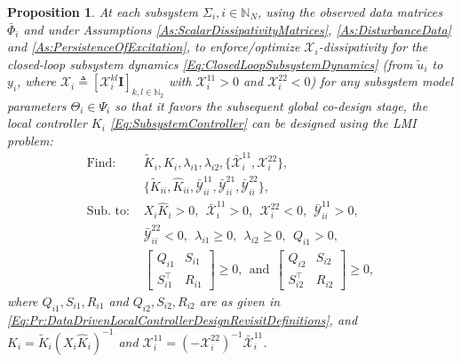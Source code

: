 \documentclass[letterpaper, 10 pt, conference]{ieeeconf}%
\newcommand{\N}{\mathbb{N}}
\newcommand{\T}{\top}
\newcommand{\I}{\mathbf{I}}
\newcommand{\0}{\mathbf{0}}
\newcommand{\X}{\mathcal{X}}
\newcommand{\Y}{\mathcal{Y}}
\newcommand{\x}{{\scriptstyle \X}}
\newcommand{\y}{{\scriptstyle \Y}}
\newcommand{\bm}[1]{\begin{bmatrix}#1\end{bmatrix}}
\newtheorem{proposition}{\textbf{Proposition}}
\begin{document}
\begin{proposition}\label{Pr:DataDrivenLocalControllerDesignRevisit}
At each subsystem $\Sigma_i, i \in \N_N$, using the observed data matrices $\bar{\Phi}_i$ and under Assumptions \ref{As:ScalarDissipativityMatrices}, \ref{As:DisturbanceData} and \ref{As:PersistenceOfExcitation}, to enforce/optimize $\X_i$-dissipativity for the closed-loop subsystem dynamics \eqref{Eq:ClosedLoopSubsystemDynamics} (from $\tilde{u}_i$ to $y_i$, where $\X_i \triangleq [\x_i^{kl}\I]_{k,l\in\N_2}$ with $\x_i^{11} > 0$ and $\x_i^{22} < 0$) for any subsystem model parameters $\Theta_i \in \Psi_i$ so that it favors the subsequent global co-design stage, the local controller $K_i$ \eqref{Eq:SubsystemController} can be designed using the LMI problem:
\begin{equation}\label{Eq:Pr:DataDrivenLocalControllerDesignRevisit}
\begin{aligned}
\mbox{Find: } &\tilde{K}_i, \hat{K}_i, \lambda_{i1}, \lambda_{i2}, \{\bar{\x}_i^{11}, \x_i^{22}\}, \\ 
&\{\tilde{K}_{ii}, \hat{K}_{ii}, \bar{\y}^{11}_{ii}, \bar{\y}_{ii}^{21}, \bar{\y}_{ii}^{22}\},\\
\mbox{Sub. to: } &X_i \hat{K}_i > 0,\ \ \bar{\x}_i^{11}>0,\ \ \x_i^{22} < 0,\ \ \bar{\y}^{11}_{ii} > 0,\\ 
&\bar{\y}^{22}_{ii} < 0,\ \ \lambda_{i1} \geq 0,\ \ \lambda_{i2} \geq 0,\ \ Q_{i1}>0,\\ 
&\bm{Q_{i1} & S_{i1} \\ S_{i1}^\T & R_{i1}} \geq 0,\ \ \mbox{and}\ \ \bm{Q_{i2} & S_{i2} \\ S_{i2}^\T & R_{i2}} \geq 0,
\end{aligned}
\end{equation}
where $Q_{i1},S_{i1},R_{i1}$ and $Q_{i2},S_{i2},R_{i2}$ are as given in \eqref{Eq:Pr:DataDrivenLocalControllerDesignRevisitDefinitions}, and $K_i = \tilde{K}_i (X_i \hat{K}_i)^{-1}$ and $\x_i^{11} = (-\x_i^{22})^{-1} \bar{\x}^{11}_i$.
\end{proposition}
\end{document}
